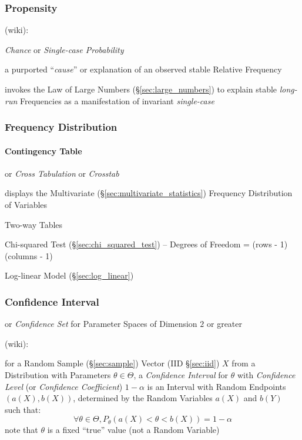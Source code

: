 \subsubsection{Propensity}\label{sec:propensity}

(wiki):

\emph{Chance} or \emph{Single-case Probability}

a purported ``\emph{cause}'' or explanation of an observed stable Relative
Frequency

invokes the Law of Large Numbers (\S\ref{sec:large_numbers}) to explain stable
\emph{long-run} Frequencies as a manifestation of invariant \emph{single-case}



\subsubsection{Frequency Distribution}\label{sec:frequency_distribution}

\paragraph{Contingency Table}\label{sec:contingency_table}\hfill

or \emph{Cross Tabulation} or \emph{Crosstab}

displays the Multivariate (\S\ref{sec:multivariate_statistics}) Frequency
Distribution of Variables

Two-way Tables

Chi-squared Test (\S\ref{sec:chi_squared_test}) -- Degrees of Freedom =
(rows - 1)(columns - 1)

Log-linear Model (\S\ref{sec:log_linear})



\subsubsection{Confidence Interval}\label{sec:confidence_interval}

or \emph{Confidence Set} for Parameter Spaces of Dimension $2$ or greater

(wiki):

for a Random Sample (\S\ref{sec:sample}) Vector (IID \S\ref{sec:iid}) $X$ from a
Distribution with Parameters $\theta \in \Theta$, a \emph{Confidence Interval}
for $\theta$ with \emph{Confidence Level} (or \emph{Confidence Coefficient}) $1
- \alpha$ is an Interval with Random Endpoints $(a(X), b(X))$, determined by the
Random Variables $a(X)$ and $b(Y)$ such that:
\[
  \forall \theta \in \Theta, P_\theta(a(X) < \theta < b(X)) = 1 - \alpha
\]
note that $\theta$ is a fixed ``true'' value (not a Random Variable)

